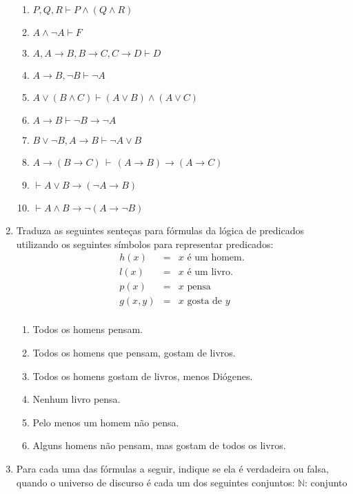 \documentclass[11pt,a4paper]{report}
\begin{document}
\begin{enumerate}
   \begin{enumerate}
     \item $P,Q,R\vdash P \land (Q \land R)$
     \item $A\land \neg A\vdash F$
     \item $A, A\rightarrow B, B\rightarrow C, C \rightarrow D \vdash D$
     \item $A\rightarrow B, \neg B \vdash \neg A$
     \item $A \lor (B \land C) \vdash (A \lor B) \land (A \lor C)$
     \item $A \rightarrow B \vdash \neg B\rightarrow \neg A$
     \item $B\lor \neg B, A\rightarrow B\vdash \neg A \lor B$
     \item $A \to (B \to C)\,\vdash\,(A \to B) \to (A \to C)$
     \item $\vdash A \lor B \to (\neg A \to B)$
     \item $\vdash A \land B \to \neg (A \to \neg B)$
   \end{enumerate}
\item Traduza as seguintes sente\c{c}as para f\'ormulas da l\'ogica de predicados utilizando os seguintes s\'imbolos
         para representar predicados:
   \[
      \begin{array}{ccl}
        h(x) & = & x \text{ \'e um homem.}\\
        l(x) & = & x \text{ \'e um livro.}\\
        p(x) & = & x \text{ pensa}\\
        g(x,y) & = & x \text{ gosta de }y\\
      \end{array}
   \]
   \begin{enumerate}
     \item Todos os homens pensam.
     \item Todos os homens que pensam, gostam de livros.
     \item Todos os homens gostam de livros, menos Di\'ogenes.
     \item Nenhum livro pensa.
     \item Pelo menos um homem n\~ao pensa.
     \item Alguns homens n\~ao pensam, mas gostam de todos os livros.
   \end{enumerate}
   \item Para cada uma das f\'ormulas a seguir, indique se ela \'e verdadeira ou falsa, 
         quando o universo de discurso \'e cada um dos seguintes conjuntos: $\mathbb{N}$: conjunto

\end{enumerate}
\end{document}
